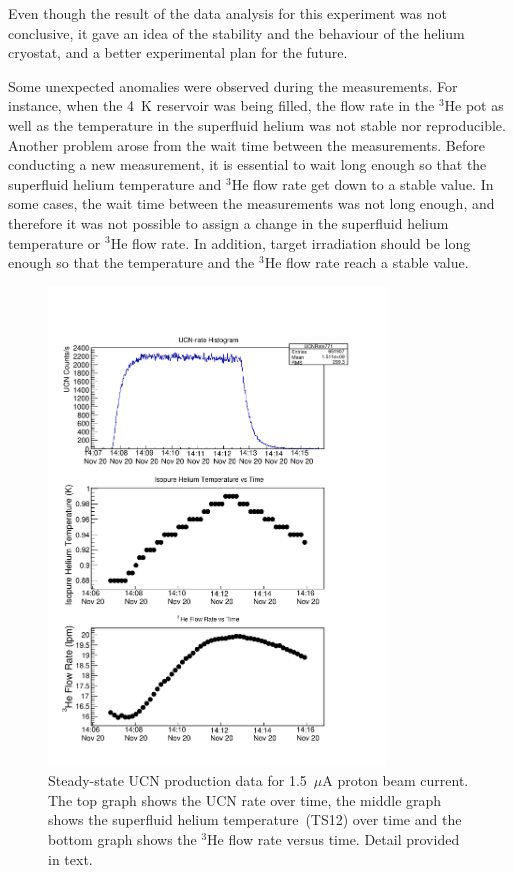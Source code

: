 Even though the result of the data analysis for this experiment was
not conclusive, it gave an idea of the stability and the behaviour of
the helium cryostat, and a better experimental plan for the future.

Some unexpected anomalies were observed during the measurements. For
instance, when the 4~K reservoir was being filled, the flow rate in
the $^3$He pot as well as the temperature in the superfluid helium was
not stable nor reproducible. Another problem arose from the wait time
between the measurements. Before conducting a new measurement, it is
essential to wait long enough so that the superfluid helium
temperature and $^3$He flow rate get down to a stable value. In some
cases, the wait time between the measurements was not long enough, and
therefore it was not possible to assign a change in the superfluid
helium temperature or $^3$He flow rate. In addition, target
irradiation should be long enough so that the temperature and the
$^3$He flow rate reach a stable value.


\begin{figure}[h!]
  \centering \includegraphics[width=0.8\textwidth]{problemrun.pdf}
  \caption[Steady-state UCN production data for 1.5~$\mu$A proton beam
  current]{Steady-state UCN production data for 1.5~$\mu$A proton beam
    current. The top graph shows the UCN rate over time, the middle
    graph shows the superfluid helium temperature~(TS12) over time and
    the bottom graph shows the $^3$He flow rate versus time. Detail
    provided in text.}
\label{fig:problemrun}
\end{figure}

